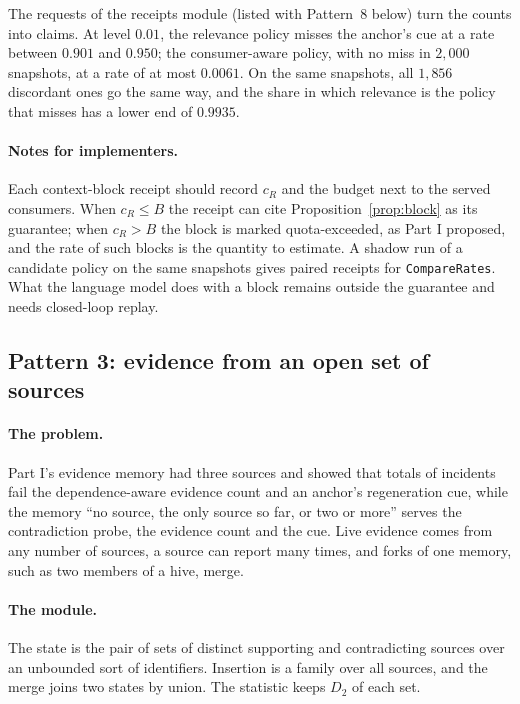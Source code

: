 \documentclass[11pt]{article}
\newcommand{\code}[1]{\texttt{#1}}
\theoremstyle{definition}
\theoremstyle{plain}
\begin{document}
The requests of the receipts module (listed with Pattern~8 below) turn the counts into claims. At
level $0.01$, the relevance policy misses the anchor's cue at a rate between $0.901$ and $0.950$;
the consumer-aware policy, with no miss in $2{,}000$ snapshots, at a rate of at most $0.0061$. On
the same snapshots, all $1{,}856$ discordant ones go the same way, and the share in which relevance
is the policy that misses has a lower end of $0.9935$.

\paragraph{Notes for implementers.} Each context-block receipt should record $c_R$ and the budget
next to the served consumers. When $c_R\le B$ the receipt can cite Proposition~\ref{prop:block} as
its guarantee; when $c_R>B$ the block is marked quota-exceeded, as Part I proposed, and the
rate of such blocks is the quantity to estimate. A shadow run of a candidate policy on the same
snapshots gives paired receipts for \code{CompareRates}. What the language model does with a block
remains outside the guarantee and needs closed-loop replay.

\subsection{Pattern 3: evidence from an open set of sources}\label{sec:lp3}

\paragraph{The problem.} Part I's evidence memory had three sources and showed that totals of
incidents fail the dependence-aware evidence count and an anchor's regeneration cue, while the
memory ``no source, the only source so far, or two or more'' serves the contradiction probe, the
evidence count and the cue. Live evidence comes from any number of sources, a source can report
many times, and forks of one memory, such as two members of a hive, merge.

\paragraph{The module.} The state is the pair of sets of distinct supporting and contradicting
sources over an unbounded sort of identifiers. Insertion is a family over all sources, and the
merge joins two states by union. The statistic keeps $D_2$ of each set.
\end{document}
